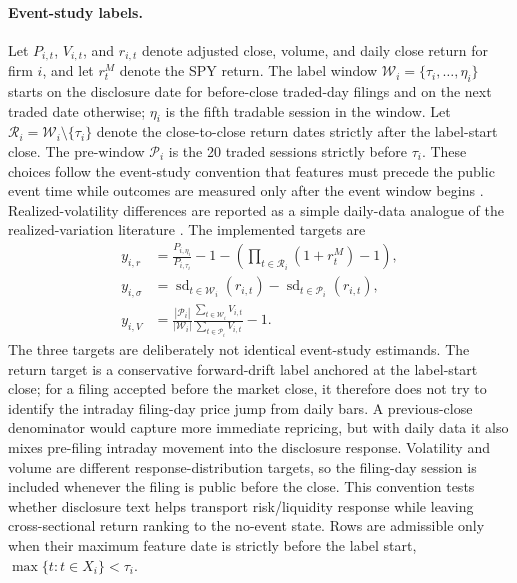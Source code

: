 \documentclass[10pt,letterpaper]{article}
\begin{document}
\paragraph{Event-study labels.}
Let \(P_{i,t}\), \(V_{i,t}\), and \(r_{i,t}\) denote adjusted close, volume, and daily close return
for firm \(i\), and let \(r^M_t\) denote the SPY return. The label window
\(\mathcal{W}_i=\{\tau_i,\ldots,\eta_i\}\) starts on the disclosure date for before-close traded-day
filings and on the next traded date otherwise; \(\eta_i\) is the fifth tradable session in the
window. Let \(\mathcal{R}_i=\mathcal{W}_i\setminus\{\tau_i\}\) denote the close-to-close return
dates strictly after the label-start close. The pre-window
\(\mathcal{P}_i\) is the 20 traded sessions strictly before \(\tau_i\). These choices follow the
event-study convention that features must precede the public event time while outcomes are measured
only after the event window begins \citep{brown1985eventstudies,mackinlay1997eventstudies,
patell1984anticipated,boehmer1991event}. Realized-volatility differences are reported as a simple
daily-data analogue of the realized-variation literature \citep{andersen2003modeling}. The
implemented targets are
\begin{align}
    y_{i,r}
    &= \frac{P_{i,\eta_i}}{P_{i,\tau_i}} - 1
    - \left(\prod_{t\in\mathcal{R}_i}(1+r^M_t)-1\right),\\
    y_{i,\sigma}
    &= \operatorname{sd}_{t\in\mathcal{W}_i}(r_{i,t})
    - \operatorname{sd}_{t\in\mathcal{P}_i}(r_{i,t}),\\
    y_{i,V}
    &= \frac{|\mathcal{P}_i|}{|\mathcal{W}_i|}
    \frac{\sum_{t\in\mathcal{W}_i} V_{i,t}}{\sum_{t\in\mathcal{P}_i} V_{i,t}} - 1.
\end{align}
The three targets are deliberately not identical event-study estimands. The return target is a
conservative forward-drift label anchored at the label-start close; for a filing accepted before the
market close, it therefore does not try to identify the intraday filing-day price jump from daily
bars. A previous-close denominator would capture more immediate repricing, but with daily data it
also mixes pre-filing intraday movement into the disclosure response. Volatility and volume are
different response-distribution targets, so the filing-day session is included whenever the filing
is public before the close. This convention tests whether disclosure text helps transport
risk/liquidity response while leaving cross-sectional return ranking to the no-event state.
Rows are admissible only when their maximum feature date is strictly before the label start,
\(\max\{t:t\in X_i\}<\tau_i\).
\end{document}
